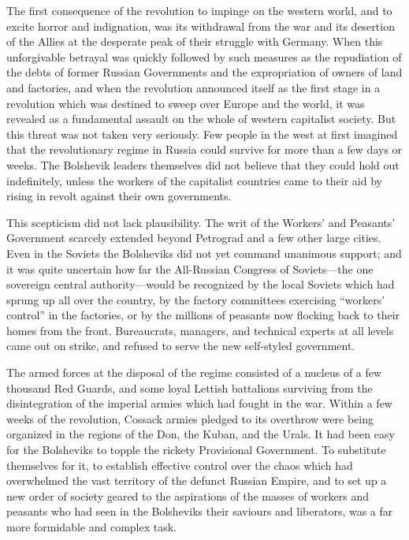 The first consequence of the revolution to impinge on the western world, and to excite horror and indignation, was its withdrawal from the war and its desertion of the Allies at the desperate peak of their struggle with Germany. When this unforgivable betrayal was quickly followed by such measures as the repudiation of the debts of former Russian Governments and the expropriation of owners of land and factories, and when the revolution announced itself as the first stage in a revolution which was destined to sweep over Europe and the world, it was revealed as a fundamental assault on the whole of western capitalist society. But this threat was not taken very seriously. Few people in the west at first imagined that the revolutionary regime in Russia could survive for more than a few days or weeks. The Bolshevik leaders themselves did not believe that they could hold out indefinitely, unless the workers of the capitalist countries came to their aid by rising in revolt against their own governments. 

This scepticism did not lack plausibility. The writ of the Workers' and Peasants' Government scarcely extended beyond Petrograd and a few other large cities. Even in the Soviets the Bolsheviks did not yet command unanimous support; and it was quite uncertain how far the All-Russian Congress of Soviets---the one sovereign central authority---would be recognized by the local Soviets which had sprung up all over the country, by the factory committees exercising ``workers' control'' in the factories, or by the millions of peasants now flocking back to their homes from the front. Bureaucrats, managers, and technical experts at all levels came out on strike, and refused to serve the new self-styled government. 

The armed forces at the disposal of the regime consisted of a nucleus of a few thousand Red Guards, and some loyal Lettish battalions surviving from the disintegration of the imperial armies which had fought in the war. Within a few weeks of the revolution, Cossack armies pledged to its overthrow were being organized in the regions of the Don, the Kuban, and the Urals. It had been easy for the Bolsheviks to topple the rickety Provisional Government. To substitute themselves for it, to establish effective control over the chaos which had overwhelmed the vast territory of the defunct Russian Empire, and to set up a new order of society geared to the aspirations of the masses of workers and peasants who had seen in the Bolsheviks their saviours and liberators, was a far more formidable and complex task.
